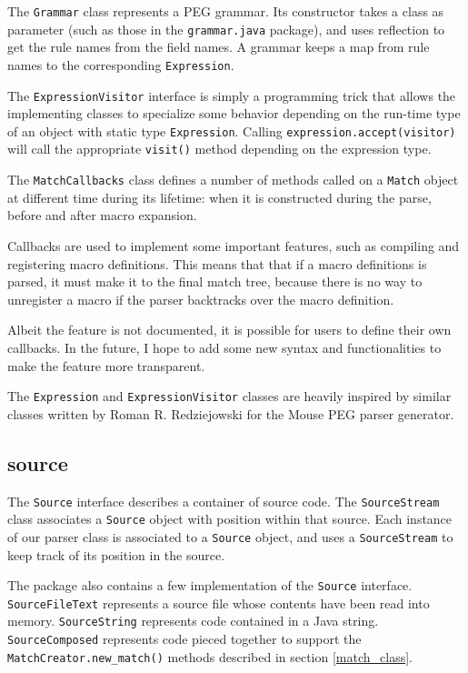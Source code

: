 The \texttt{Grammar} class represents a PEG grammar. Its constructor takes a
class as parameter (such as those in the \texttt{grammar.java} package), and
uses reflection to get the rule names from the field names. A grammar keeps a
map from rule names to the corresponding \texttt{Expression}.

The \texttt{ExpressionVisitor} interface is simply a programming trick that
allows the implementing classes to specialize some behavior depending on the
run-time type of an object with static type \texttt{Expression}. Calling
\texttt{expression.accept(visitor)} will call the appropriate \texttt{visit()}
method depending on the expression type.

The \texttt{MatchCallbacks} class defines a number of methods called on a
\texttt{Match} object at different time during its lifetime: when it is
constructed during the parse, before and after macro expansion.

Callbacks are used to implement some important features, such as compiling and
registering macro definitions. This means that that if a macro definitions is
parsed, it must make it to the final match tree, because there is no way to
unregister a macro if the parser backtracks over the macro definition.

Albeit the feature is not documented, it is possible for users to define their
own callbacks. In the future, I hope to add some new syntax and functionalities
to make the feature more transparent.

The \texttt{Expression} and \texttt{ExpressionVisitor} classes are heavily
inspired by similar classes written by Roman R. Redziejowski for the Mouse PEG
parser generator. \cite{redziejowski2009}

\subsection{source}

The \texttt{Source} interface describes a container of source code. The
\texttt{SourceStream} class associates a \texttt{Source} object with position
within that source. Each instance of our parser class is associated to a
\texttt{Source} object, and uses a \texttt{SourceStream} to keep track of its
position in the source.

The package also contains a few implementation of the \texttt{Source}
interface. \texttt{SourceFileText} represents a source file whose contents have
been read into memory. \texttt{SourceString} represents code contained in a Java
string. \texttt{SourceComposed} represents code pieced together to support the
\texttt{MatchCreator.new_match()} methods described in section
\ref{match_class}.

